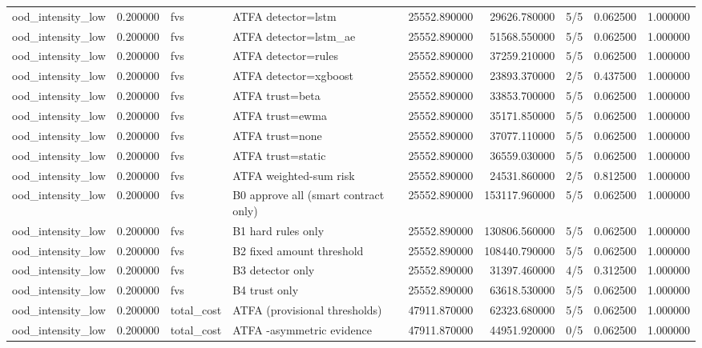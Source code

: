 \begin{tabular}{lrllrrlrr}
ood\_intensity\_low & 0.200000 & fvs & ATFA detector=lstm & 25552.890000 & 29626.780000 & 5/5 & 0.062500 & 1.000000 \\
ood\_intensity\_low & 0.200000 & fvs & ATFA detector=lstm\_ae & 25552.890000 & 51568.550000 & 5/5 & 0.062500 & 1.000000 \\
ood\_intensity\_low & 0.200000 & fvs & ATFA detector=rules & 25552.890000 & 37259.210000 & 5/5 & 0.062500 & 1.000000 \\
ood\_intensity\_low & 0.200000 & fvs & ATFA detector=xgboost & 25552.890000 & 23893.370000 & 2/5 & 0.437500 & 1.000000 \\
ood\_intensity\_low & 0.200000 & fvs & ATFA trust=beta & 25552.890000 & 33853.700000 & 5/5 & 0.062500 & 1.000000 \\
ood\_intensity\_low & 0.200000 & fvs & ATFA trust=ewma & 25552.890000 & 35171.850000 & 5/5 & 0.062500 & 1.000000 \\
ood\_intensity\_low & 0.200000 & fvs & ATFA trust=none & 25552.890000 & 37077.110000 & 5/5 & 0.062500 & 1.000000 \\
ood\_intensity\_low & 0.200000 & fvs & ATFA trust=static & 25552.890000 & 36559.030000 & 5/5 & 0.062500 & 1.000000 \\
ood\_intensity\_low & 0.200000 & fvs & ATFA weighted-sum risk & 25552.890000 & 24531.860000 & 2/5 & 0.812500 & 1.000000 \\
ood\_intensity\_low & 0.200000 & fvs & B0 approve all (smart contract only) & 25552.890000 & 153117.960000 & 5/5 & 0.062500 & 1.000000 \\
ood\_intensity\_low & 0.200000 & fvs & B1 hard rules only & 25552.890000 & 130806.560000 & 5/5 & 0.062500 & 1.000000 \\
ood\_intensity\_low & 0.200000 & fvs & B2 fixed amount threshold & 25552.890000 & 108440.790000 & 5/5 & 0.062500 & 1.000000 \\
ood\_intensity\_low & 0.200000 & fvs & B3 detector only & 25552.890000 & 31397.460000 & 4/5 & 0.312500 & 1.000000 \\
ood\_intensity\_low & 0.200000 & fvs & B4 trust only & 25552.890000 & 63618.530000 & 5/5 & 0.062500 & 1.000000 \\
ood\_intensity\_low & 0.200000 & total\_cost & ATFA (provisional thresholds) & 47911.870000 & 62323.680000 & 5/5 & 0.062500 & 1.000000 \\
ood\_intensity\_low & 0.200000 & total\_cost & ATFA -asymmetric evidence & 47911.870000 & 44951.920000 & 0/5 & 0.062500 & 1.000000 \\

\end{tabular}
